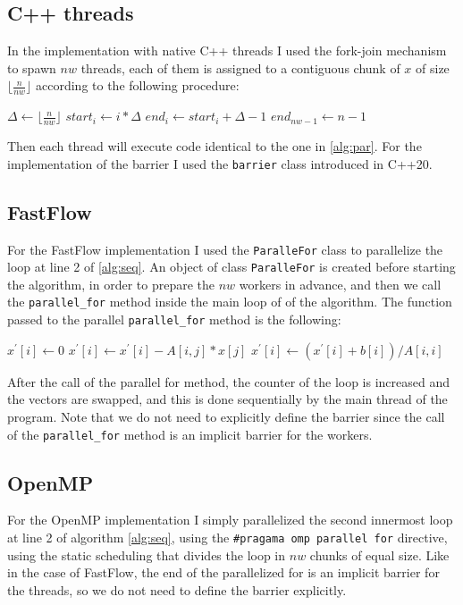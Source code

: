 \documentclass[12pt]{article}
\begin{document}
	\subsection{C++ threads}
	In the implementation with native C++ threads I used the fork-join mechanism to spawn $nw$ threads, each of them is assigned to a contiguous chunk of $x$ of size $\lfloor\frac{n}{nw}\rfloor$ according to the following procedure:
	\begin{algorithmic}
		\State $\Delta \gets \lfloor\frac{n}{nw}\rfloor$
			\State $start_i \gets i*\Delta$
			\State $end_i \gets start_i + \Delta - 1$
		\EndFor
		\State $end_{nw-1} \gets n-1$
	\end{algorithmic}
	Then each thread will execute code identical to the one in \ref{alg:par}. For the implementation of the barrier I used the \verb*|barrier| class introduced in C++20.
	\subsection{FastFlow}
	For the FastFlow implementation I used the \verb|ParalleFor| class to parallelize the loop at line 2 of \ref{alg:seq}. An object of class \verb|ParalleFor| is created before starting the algorithm, in order to prepare the $nw$ workers in advance, and then we call the \verb*|parallel_for| method inside the main loop of of the algorithm. The function passed to the parallel \verb*|parallel_for| method is the following:
	\begin{algorithmic}
		\Function{parallel\_for\_iteration}{$i$}
		\State $x^\prime[i] \gets 0$
		\For{$j \gets 0$ to  $n-1$}
		\If{$i \ne j$}
		\State $x^\prime[i] \gets x^\prime[i] - A[i,j]*x[j]$
		\EndIf
		\EndFor
		\State $x^\prime[i] \gets (x^\prime[i] + b[i])/A[i,i]$
		\EndFunction
	\end{algorithmic}
	After the call of the parallel for method, the counter of the loop is increased and the vectors are swapped, and this is done sequentially by the main thread of the program. Note that we do not need to explicitly define the barrier since the call of the \verb*|parallel_for| method is an implicit barrier for the workers. 
	\subsection{OpenMP}
	For the OpenMP implementation I simply parallelized the second innermost loop at line 2 of algorithm \ref{alg:seq}, using the \verb|#pragama omp parallel for| directive, using the static scheduling that divides the loop in $nw$ chunks of equal size. Like in the case of FastFlow, the end of the parallelized for is an implicit barrier for the threads, so we do not need to define the barrier explicitly.  
\end{document}
